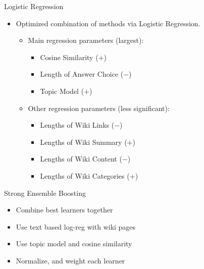 \documentclass{beamer}
\begin{document}
\begin{frame}{Logistic Regression}
    \begin{itemize}
        \item Optimized combination of methods via Logistic Regression.
            \begin{itemize}
                \item Main regression parameters (largest):
		\begin{itemize}
		    \item Cosine Similarity ({\color{green}$+$})
		    \item Length of Answer Choice ({\color{red}$-$})
		    \item Topic Model ({\color{green}$+$})
		\end{itemize}
	    \item Other regression parameters (less significant):
		\begin{itemize}
		    \item Lengths of Wiki Links ({\color{red}$-$})
		    \item Lengths of Wiki Summary ({\color{green}$+$})
		    \item Lengths of Wiki Content ({\color{red}$-$})
		    \item Lengths of Wiki Categories ({\color{green}$+$})
		\end{itemize}
            \end{itemize}
    \end{itemize}
\end{frame}


\begin{frame}{Strong Ensemble Boosting}
   \begin{itemize}
      \item Combine best learners together
      \item Use text based log-reg with wiki pages
      \item Use topic model and cosine similarity
      \item Normalize, and weight each learner
   \end{itemize}
\end{frame}
\end{document}

